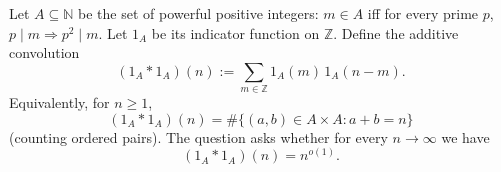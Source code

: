 Let $A\subseteq\mathbb{N}$ be the set of powerful positive integers: $m\in A$ iff for every prime $p$, $p\mid m\Rightarrow p^2\mid m$. Let $1_A$ be its indicator function on $\mathbb{Z}$.
Define the additive convolution
\[
(1_A*1_A)(n) := \sum_{m\in\mathbb{Z}} 1_A(m)\,1_A(n-m).
\]
Equivalently, for $n\ge 1$,
\[
(1_A*1_A)(n)=\#\{(a,b)\in A\times A: a+b=n\}
\]
(counting ordered pairs).
The question asks whether for every $n\to\infty$ we have
\[
(1_A*1_A)(n)=n^{o(1)}.
\]
